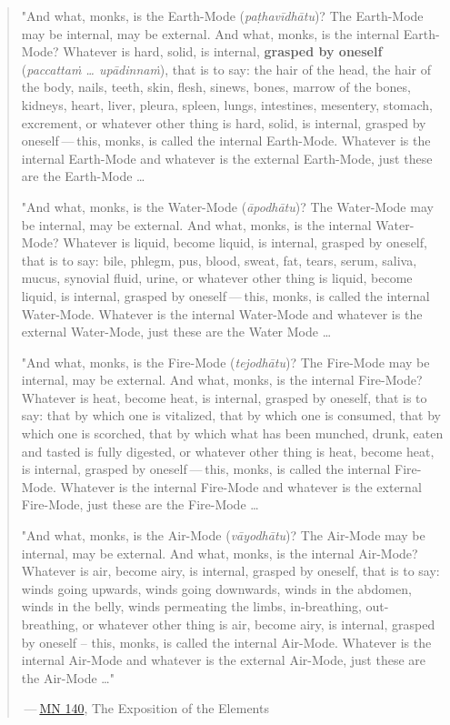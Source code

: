 \begin{quotation}
"And what, monks, is the Earth-Mode (\emph{paṭhavīdhātu})? The Earth-Mode
may be internal, may be external. And what, monks, is the internal
Earth-Mode? Whatever is hard, solid, is internal, \textbf{grasped by oneself}
(\emph{paccattaṁ … upādinnaṁ}), that is to say: the hair of the head, the
hair of the body, nails, teeth, skin, flesh, sinews, bones, marrow of
the bones, kidneys, heart, liver, pleura, spleen, lungs, intestines,
mesentery, stomach, excrement, or whatever other thing is hard, solid,
is internal, grasped by oneself — this, monks, is called the internal
Earth-Mode. Whatever is the internal Earth-Mode and whatever is the
external Earth-Mode, just these are the Earth-Mode …


"And what, monks, is the Water-Mode (\emph{āpodhātu})? The Water-Mode may
be internal, may be external. And what, monks, is the internal
Water-Mode? Whatever is liquid, become liquid, is internal, grasped by
oneself, that is to say: bile, phlegm, pus, blood, sweat, fat, tears,
serum, saliva, mucus, synovial fluid, urine, or whatever other thing is
liquid, become liquid, is internal, grasped by oneself — this, monks, is
called the internal Water-Mode. Whatever is the internal Water-Mode and
whatever is the external Water-Mode, just these are the Water Mode …


"And what, monks, is the Fire-Mode (\emph{tejodhātu})? The Fire-Mode may be
internal, may be external. And what, monks, is the internal Fire-Mode?
Whatever is heat, become heat, is internal, grasped by oneself, that is
to say: that by which one is vitalized, that by which one is consumed,
that by which one is scorched, that by which what has been munched,
drunk, eaten and tasted is fully digested, or whatever other thing is
heat, become heat, is internal, grasped by oneself — this, monks, is
called the internal Fire-Mode. Whatever is the internal Fire-Mode and
whatever is the external Fire-Mode, just these are the Fire-Mode …


"And what, monks, is the Air-Mode (\emph{vāyodhātu})? The Air-Mode may be
internal, may be external. And what, monks, is the internal Air-Mode?
Whatever is air, become airy, is internal, grasped by oneself, that is
to say: winds going upwards, winds going downwards, winds in the
abdomen, winds in the belly, winds permeating the limbs, in-breathing,
out-breathing, or whatever other thing is air, become airy, is internal,
grasped by oneself – this, monks, is called the internal Air-Mode.
Whatever is the internal Air-Mode and whatever is the external Air-Mode,
just these are the Air-Mode …"


 — \href{https://suttacentral.net/mn140/en/bodhi}{MN 140}, The Exposition of the Elements


\end{quotation}

